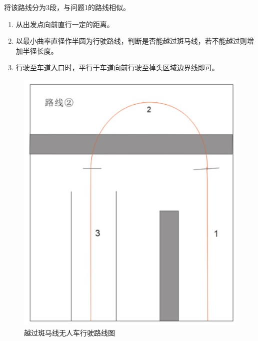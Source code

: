 \documentclass{article}
\begin{document}
将该路线分为3段，与问题1的路线相似。
\begin{enumerate}[\indent 第1段：]
    \item 从出发点向前直行一定的距离。
    \item 以最小曲率直径作半圆为行驶路线，判断是否能越过斑马线，若不能越过则增加半径长度。
    \item 行驶至车道入口时，平行于车道向前行驶至掉头区域边界线即可。
\end{enumerate}
\begin{figure}[H]
    \centering
    \includegraphics[scale=0.8]{23.jpg}
    \caption{越过斑马线无人车行驶路线图}
\end{figure}
\end{document}

